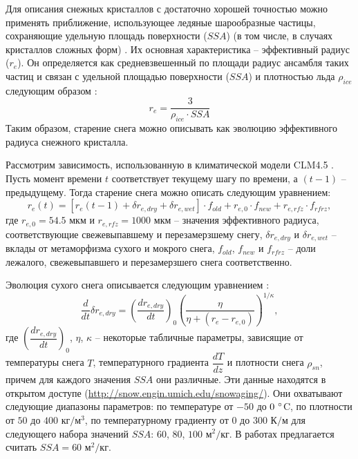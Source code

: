 \documentclass[a4paper, fontsize=14pt]{scrartcl}
\begin{document}
Для описания снежных кристаллов с достаточно хорошей точностью можно применять приближение, использующее ледяные шарообразные частицы, сохраняющие удельную площадь поверхности ($SSA$) (в том числе, в случаях кристаллов сложных форм) \cite{Grenfell1999}. Их основная характеристика -- эффективный радиус ($r_e$). Он определяется как средневзвешенный по площади радиус ансамбля таких частиц и связан с удельной площадью поверхности ($SSA$) и плотностью льда $\rho_{ice}$ следующим образом \cite{Flanner2006}:  
\begin{equation}
    r_e = \dfrac{3} {\rho_{ice} \cdot SSA} \label{sys}
\end{equation}
Таким образом, старение снега можно описывать как эволюцию эффективного радиуса снежного кристалла. 

Рассмотрим зависимость, использованную в климатической модели CLM4.5 \cite{CLM4.5tech}. Пусть момент времени $t$ соответствует текущему шагу по времени, а $(t - 1)$ -- предыдущему. Тогда старение снега можно описать следующим уравнением:
\begin{equation}
    r_e(t) = [r_e (t - 1) + \delta r_{e , dry} + \delta r_{e , wet} ] \cdot f_{old} + r_{e ,0} \cdot f_{new} + r_{e , rfz} \cdot f_{rfrz}, \label{sysRDS1}
\end{equation}
где $ r_{e ,0} = 54.5 $ мкм и $r_{e , rfz} = 1000 $ мкм -- значения эффективного радиуса, соответствующие свежевыпавшему и перезамерзшему снегу, $\delta r_{e , dry}$ и $\delta r_{e , wet}$ -- вклады от метаморфизма сухого и мокрого снега, $f_{old}$, $f_{new}$ и $f_{rfrz}$ -- доли лежалого, свежевыпавшего и перезамерзшего снега соответственно.  

Эволюция сухого снега описывается следующим уравнением \cite{Flanner2006, Flanner2007, CLM4.5tech}:
\begin{equation}
    \dfrac{d}{dt} \delta r_{e , dry} = {\left( \dfrac{dr_{e , dry}}{dt} \right)}_0 \left(\dfrac{\eta}{\eta + (r_e - r_{e, 0})}\right)^{1 / \kappa}, \label{sys}
\end{equation}
где ${\left( \dfrac{dr_{e , dry}}{dt} \right)}_0$, $\eta$, $\kappa$ -- некоторые табличные параметры, зависящие от температуры снега $T$, температурного градиента $\dfrac{dT}{dz}$ и плотности снега $\rho_{sn}$, причем для каждого значения $SSA$ они различные. Эти данные находятся в открытом доступе (\url{http://snow.engin.umich.edu/snowaging/}). Они охватывают следующие диапазоны параметров: по температуре от $-50$ до $0 ~\degree$C, по плотности от $50$ до $400$ кг$/$м$^3$, по температурному градиенту от $0$ до $300$ К$/$м для следующего набора значений $SSA$: $60$, $80$, $100$ м$^2/$кг. В работах \cite{CLM4.5tech, Flanner2006, Flanner2007} предлагается считать $SSA = 60$ м$^2/$кг.
\end{document}
